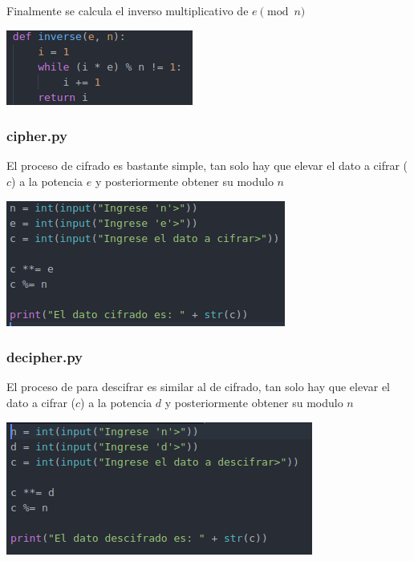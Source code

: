 \documentclass{article}
\begin{document}
  Finalmente se calcula el inverso multiplicativo de $e \pmod{n}$
  \begin{center}
    \includegraphics{img/inverse.png}
  \end{center}

  \subsubsection{cipher.py}
  El proceso de cifrado es bastante simple, tan solo hay que elevar el dato a cifrar ($c$) a la potencia $e$ y posteriormente obtener su modulo $n$
  \begin{center}
    \includegraphics{img/cipher.png}
  \end{center}

  \subsubsection{decipher.py}
  El proceso de para descifrar es similar al de cifrado, tan solo hay que elevar el dato a cifrar ($c$) a la potencia $d$ y posteriormente obtener su modulo $n$
  \begin{center}
    \includegraphics{img/decipher.png}
  \end{center}
\end{document}
